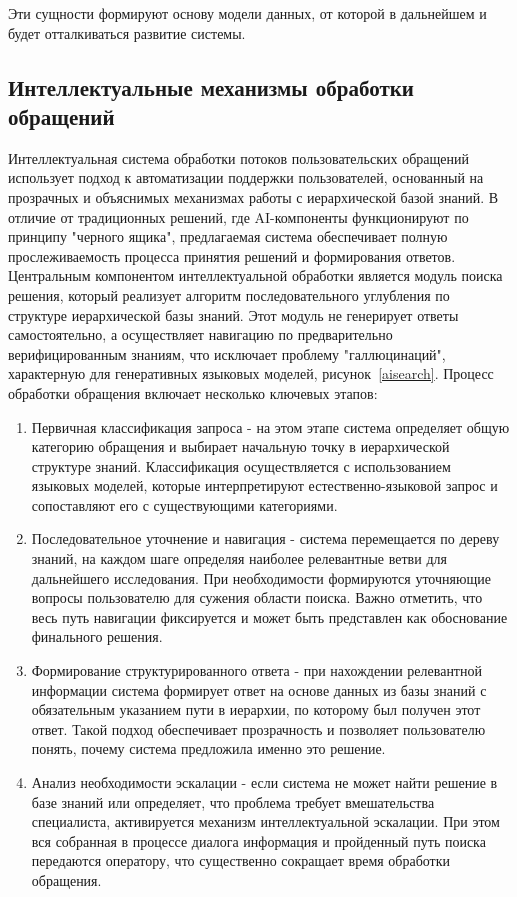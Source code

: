 Эти сущности формируют основу модели данных, от которой в дальнейшем и будет отталкиваться развитие системы.

\subsection{Интеллектуальные механизмы обработки обращений}

Интеллектуальная система обработки потоков пользовательских обращений использует подход к автоматизации поддержки пользователей, основанный на прозрачных и объяснимых механизмах работы с иерархической базой знаний. В отличие от традиционных решений, где AI-компоненты функционируют по принципу "черного ящика", предлагаемая система обеспечивает полную прослеживаемость процесса принятия решений и формирования ответов.
Центральным компонентом интеллектуальной обработки является модуль поиска решения, который реализует алгоритм последовательного углубления по структуре иерархической базы знаний. Этот модуль не генерирует ответы самостоятельно, а осуществляет навигацию по предварительно верифицированным знаниям, что исключает проблему "галлюцинаций", характерную для генеративных языковых моделей, рисунок~\ref{aisearch}.
Процесс обработки обращения включает несколько ключевых этапов:
\begin{enumerate}[label=\arabic*.]
    \item Первичная классификация запроса - на этом этапе система определяет общую категорию обращения и выбирает начальную точку в иерархической структуре знаний. Классификация осуществляется с использованием языковых моделей, которые интерпретируют естественно-языковой запрос и сопоставляют его с существующими категориями.
    \item Последовательное уточнение и навигация - система перемещается по дереву знаний, на каждом шаге определяя наиболее релевантные ветви для дальнейшего исследования. При необходимости формируются уточняющие вопросы пользователю для сужения области поиска. Важно отметить, что весь путь навигации фиксируется и может быть представлен как обоснование финального решения.
    \item Формирование структурированного ответа - при нахождении релевантной информации система формирует ответ на основе данных из базы знаний с обязательным указанием пути в иерархии, по которому был получен этот ответ. Такой подход обеспечивает прозрачность и позволяет пользователю понять, почему система предложила именно это решение.
    \item Анализ необходимости эскалации - если система не может найти решение в базе знаний или определяет, что проблема требует вмешательства специалиста, активируется механизм интеллектуальной эскалации. При этом вся собранная в процессе диалога информация и пройденный путь поиска передаются оператору, что существенно сокращает время обработки обращения.
\end{enumerate}

